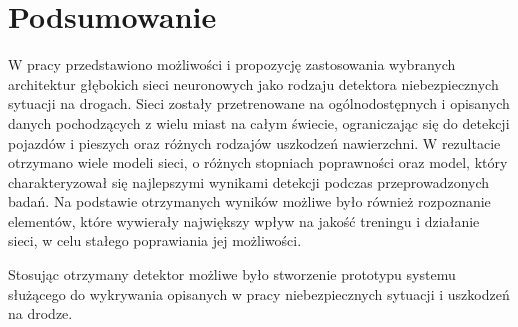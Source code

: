 \chapter{Podsumowanie}


\hspace{0.5cm}
W pracy przedstawiono możliwości i propozycję zastosowania wybranych architektur głębokich sieci neuronowych jako rodzaju detektora niebezpiecznych sytuacji na drogach. Sieci zostały przetrenowane na ogólnodostępnych i opisanych danych pochodzących z wielu miast na całym świecie, ograniczając się do detekcji pojazdów i pieszych oraz różnych rodzajów uszkodzeń nawierzchni. W rezultacie otrzymano wiele modeli sieci, o różnych stopniach poprawności oraz model, który charakteryzował się najlepszymi wynikami detekcji podczas przeprowadzonych badań. Na podstawie otrzymanych wyników możliwe było również rozpoznanie elementów, które wywierały największy wpływ na jakość treningu i działanie sieci, w celu stałego poprawiania jej możliwości.

\hspace{0.5cm}
Stosując otrzymany detektor możliwe było stworzenie prototypu systemu
służącego do wykrywania opisanych w pracy niebezpiecznych sytuacji i uszkodzeń na drodze. 


